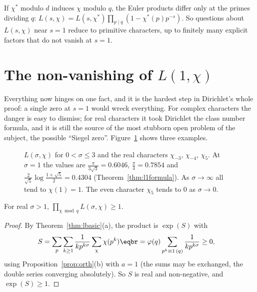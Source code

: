 If $\chi^*$ modulo $d$ induces $\chi$ modulo $q$, the Euler products differ only at the primes dividing $q$:
$L(s,\chi)=L(s,\chi^*)\prod_{p\mid q}(1-\chi^*(p)p^{-s})$. So questions about $L(s,\chi)$ near $s=1$ reduce to primitive characters, up to finitely many
explicit factors that do not vanish at $s=1$.

\section{The non-vanishing of \texorpdfstring{$L(1,\chi)$}{L(1,chi)}}

Everything now hinges on one fact, and it is the hardest step in Dirichlet's whole proof: a single zero at $s=1$ would wreck everything. For
complex characters the danger is easy to dismiss; for real characters it took Dirichlet the class number formula, and it is still the source
of the most stubborn open problem of the subject, the possible ``Siegel zero''. Figure~\ref{fig:lreal} shows three examples.

\begin{figure}[ht]
\centering
{}
\caption{$L(\sigma,\chi)$ for $0<\sigma\le3$ and the real characters $\chi_{-3}$, $\chi_{-4}$, $\chi_5$. At $\sigma=1$ the values are $\frac\pi{3\sqrt3}=0.6046$, $\frac\pi4=0.7854$ and
$\frac2{\sqrt5}\log\frac{1+\sqrt5}2=0.4304$ (Theorem~\ref{thm:l1formula}). As $\sigma\to\infty$ all tend to $\chi(1)=1$. The even character $\chi_5$ tends to $0$ as $\sigma\to0$.}
\label{fig:lreal}
\end{figure}

\begin{lemma}\label{lem:prodchars}
For real $\sigma>1$, $\prod_{\chi\bmod q}L(\sigma,\chi)\ge1$.
\end{lemma}
\begin{proof}
By Theorem~\ref{thm:lbasic}(a), the product is $\exp(S)$ with
\[
\begin{aligned}S&=\sum_p\sum_{k\ge1}\frac1{kp^{k\sigma}}\sum_\chi\chi(p^k)\eqbr=\varphi(q)\sum_{p^k\equiv1\,(q)}\frac1{kp^{k\sigma}}\ge0,\end{aligned}
\]
using Proposition~\ref{prop:orth}(b) with $a=1$ (the sums may be exchanged, the double series converging absolutely). So $S$ is real and
non-negative, and $\exp(S)\ge1$.
\end{proof}


